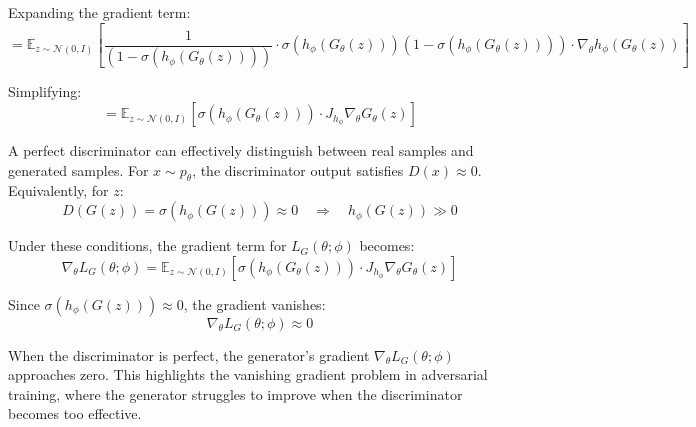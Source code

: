 \documentclass{article}
\begin{document}
Expanding the gradient term:
\[
= \mathbb{E}_{z \sim \mathcal{N}(0, I)} \left[
\frac{1}{(1 - \sigma(h_{\phi}(G_{\theta}(z))))}
\cdot \sigma(h_{\phi}(G_{\theta}(z)))(1 - \sigma(h_{\phi}(G_{\theta}(z)))) \cdot \nabla_{\theta} h_{\phi}(G_{\theta}(z))
\right]
\]

Simplifying:
\[
= \mathbb{E}_{z \sim \mathcal{N}(0, I)} \left[
\sigma(h_{\phi}(G_{\theta}(z))) \cdot J_{h_{\phi}} \nabla_{\theta} G_{\theta}(z)
\right]
\]

A perfect discriminator can effectively distinguish between real samples and generated samples. For \( x \sim p_{\theta} \), the discriminator output satisfies \( D(x) \approx 0 \). Equivalently, for \( z \):
\[
D(G(z)) = \sigma(h_{\phi}(G(z))) \approx 0 \quad \Rightarrow \quad h_{\phi}(G(z)) \gg 0
\]

Under these conditions, the gradient term for \( L_G(\theta; \phi) \) becomes:
\[
\nabla_{\theta} L_G(\theta; \phi) = \mathbb{E}_{z \sim \mathcal{N}(0, I)} \left[
\sigma(h_{\phi}(G_{\theta}(z))) \cdot J_{h_{\phi}} \nabla_{\theta} G_{\theta}(z)
\right]
\]

Since \( \sigma(h_{\phi}(G(z))) \approx 0 \), the gradient vanishes:
\[
\nabla_{\theta} L_G(\theta; \phi) \approx 0
\]

When the discriminator is perfect, the generator's gradient \( \nabla_{\theta} L_G(\theta; \phi) \) approaches zero. This highlights the vanishing gradient problem in adversarial training, where the generator struggles to improve when the discriminator becomes too effective.
\end{document}
